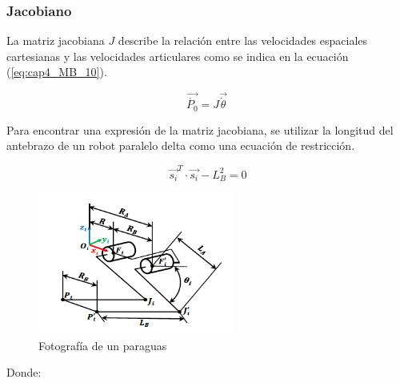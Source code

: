         \subsubsection{Jacobiano}

        La matriz jacobiana $J$ describe la relación entre las velocidades espaciales cartesianas y las velocidades articulares como se indica en la ecuación (\ref{eq:cap4_MB_10}).

        \begin{equation} 
            \overrightarrow{\dot{P_{0}}}=J\overrightarrow{\dot{ \theta }}~ 
            \label{eq:cap4_MB_10}
        \end{equation}  
   
        Para encontrar una expresión de la matriz jacobiana, se utilizar la longitud del antebrazo de un robot paralelo delta como una ecuación de restricción.

        \begin{equation} 
            \overrightarrow{s_{i}}^T \cdot \overrightarrow{s_{i}} - L_{B}^{2} = 0
            \label{eq:cap4_MB_11}
        \end{equation} 

            \begin{figure}[htb]
                 \centering
                 \includegraphics[width=0.4\linewidth]{Main/Chapter4/Images4/Metodo_B_Modelacion_Cinematica_Posicion_5.png}
                  \caption{Fotografía de un paraguas}
                  \label{f:Cap4_Metodo_B_Modelacion_Cinematica_Posicion_5}
            \end{figure}  

        \newpage
        Donde: 
        

